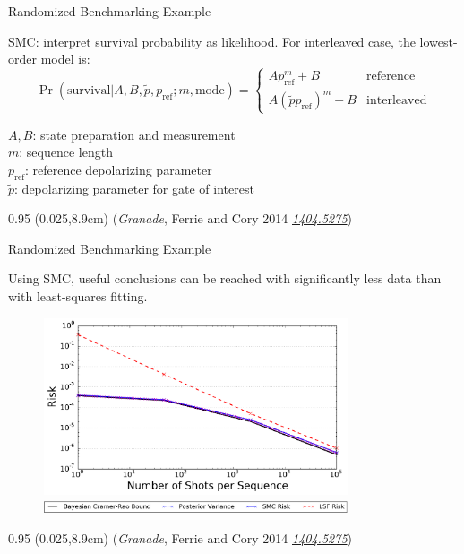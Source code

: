\documentclass[xcolor=dvipsnames, compress]{beamer}
\renewcommand\UrlFont{\color{red}\rmfamily\itshape}
\newcommand{\arxiv}[1]{\href{https://scirate.com/arxiv/#1}{\UrlFont #1}}
\newcommand{\bottomnote}[1]{
  \begin{textblock*}{0.95\paperwidth} (0.025\paperwidth,8.9cm)
    {\tiny \hfill #1}
  \end{textblock*}
}
\begin{document}
\begin{frame}{Randomized Benchmarking Example}

  SMC: interpret survival probability as likelihood.
  For interleaved case, the lowest-order model is:
  \[
    \Pr(\text{survival} | A, B, \tilde{p}, p_{\text{ref}}; m, \text{mode}) =
    \begin{cases}
      A p_{\text{ref}}^m + B & \text{reference} \\
      A (\tilde{p} p_{\text{ref}})^m + B & \text{interleaved}
    \end{cases}
  \]

  $A,B$: state preparation and measurement \\
  $m$: sequence length \\
  $p_{\text{ref}}$: reference depolarizing parameter \\
  $\tilde{p}$: depolarizing parameter for gate of interest

  \bottomnote{(\emph{Granade}, Ferrie and Cory 2014 \arxiv{1404.5275})}

\end{frame}

\begin{frame}{Randomized Benchmarking Example}

  Using SMC, useful conclusions can be reached with significantly
  less data than with least-squares fitting.

  \begin{figure}
    \centering
    \includegraphics[width=0.8\textwidth]{risk-tr-comparison} \\
    \includegraphics[width=0.8\textwidth]{risk-comparison-legend-crop}
  \end{figure}

  \bottomnote{(\emph{Granade}, Ferrie and Cory 2014 \arxiv{1404.5275})}

\end{frame}
\end{document}
